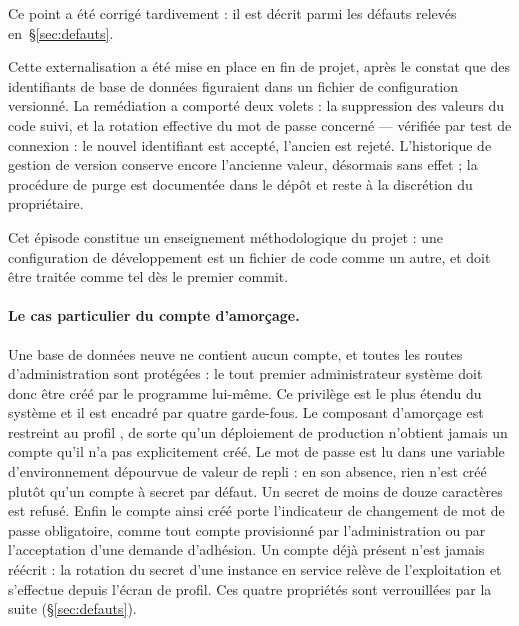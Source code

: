 Ce point a été corrigé tardivement : il est décrit parmi les défauts relevés
en~§\ref{sec:defauts}.

Cette externalisation a été mise en place en fin de projet, après le constat que des
identifiants de base de données figuraient dans un fichier de configuration versionné. La
remédiation a comporté deux volets : la suppression des valeurs du code suivi, et la
rotation effective du mot de passe concerné --- vérifiée par test de connexion : le nouvel
identifiant est accepté, l'ancien est rejeté. L'historique de gestion de version conserve
encore l'ancienne valeur, désormais sans effet ; la procédure de purge est documentée dans
le dépôt et reste à la discrétion du propriétaire.

Cet épisode constitue un enseignement méthodologique du projet : une configuration de
développement est un fichier de code comme un autre, et doit être traitée comme tel dès le
premier commit.

\paragraph{Le cas particulier du compte d'amorçage.} Une base de données neuve ne contient
aucun compte, et toutes les routes d'administration sont protégées : le tout premier
administrateur système doit donc être créé par le programme lui-même. Ce privilège est le
plus étendu du système et il est encadré par quatre garde-fous. Le composant d'amorçage
est restreint au profil , de sorte qu'un déploiement de production n'obtient
jamais un compte qu'il n'a pas explicitement créé. Le mot de passe est lu dans une variable
d'environnement dépourvue de valeur de repli : en son absence, rien n'est créé plutôt
qu'un compte à secret par défaut. Un secret de moins de douze caractères est refusé.
Enfin le compte ainsi créé porte l'indicateur de changement de mot de passe obligatoire,
comme tout compte provisionné par l'administration ou par l'acceptation d'une demande
d'adhésion. Un compte déjà présent n'est jamais réécrit : la rotation du secret d'une
instance en service relève de l'exploitation et s'effectue depuis l'écran de profil.
Ces quatre propriétés sont verrouillées par la suite 
(§\ref{sec:defauts}).
